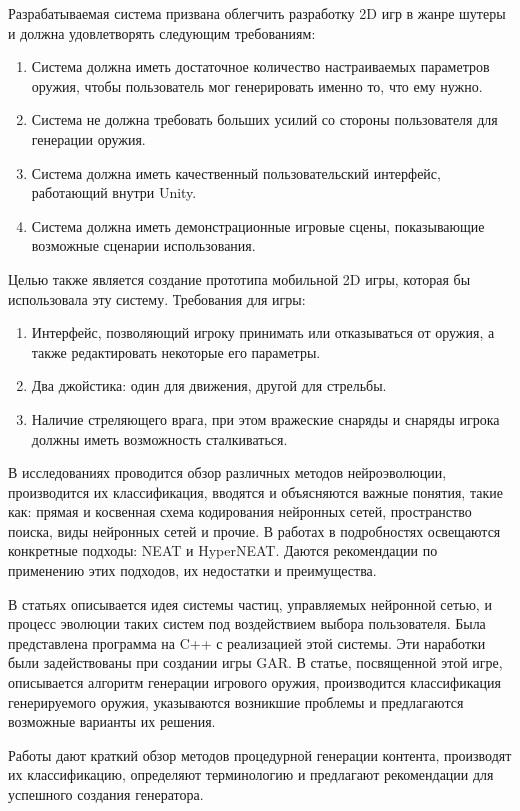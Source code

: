 Разрабатываемая система призвана облегчить разработку 2D игр в жанре шутеры и должна удовлетворять следующим требованиям:
\begin{enumerate}
    \item Система должна иметь достаточное количество настраиваемых параметров оружия, чтобы пользователь мог генерировать именно то, что ему нужно.
    \item Система не должна требовать больших усилий со стороны пользователя для генерации оружия.
    \item Система должна иметь качественный пользовательский интерфейс, работающий внутри Unity.
    \item Система должна иметь демонстрационные игровые сцены, показывающие возможные сценарии использования.
\end{enumerate}

\vspace{5mm}

Целью также является создание прототипа мобильной 2D игры, которая бы использовала эту систему. Требования для игры:
\begin{enumerate}
    \item Интерфейс, позволяющий игроку принимать или отказываться от оружия, а также редактировать некоторые его параметры.
    \item Два джойстика: один для движения, другой для стрельбы.
    \item Наличие стреляющего врага, при этом вражеские снаряды и снаряды игрока должны иметь возможность сталкиваться.
\end{enumerate}

\pagebreak


В исследованиях\cite{s4,s5} проводится обзор различных методов нейроэволюции, производится их классификация, вводятся и объясняются важные понятия, такие как: прямая и косвенная схема кодирования нейронных сетей, пространство поиска, виды нейронных сетей и прочие. В работах\cite{s1,s16} в подробностях освещаются конкретные подходы: NEAT и HyperNEAT. Даются рекомендации по применению этих подходов, их недостатки и преимущества.

В статьях\cite{s2,s3} описывается идея системы частиц, управляемых нейронной сетью, и процесс эволюции таких систем под воздействием выбора пользователя. Была представлена программа на C++ с реализацией этой системы. Эти наработки были задействованы при создании игры GAR. В статье\cite{s15}, посвященной этой игре, описывается алгоритм генерации игрового оружия, производится классификация генерируемого оружия, указываются возникшие проблемы и предлагаются возможные варианты их решения.

Работы\cite{s6,s11} дают краткий обзор методов процедурной генерации контента, производят их классификацию, определяют терминологию и предлагают рекомендации для успешного создания генератора.


